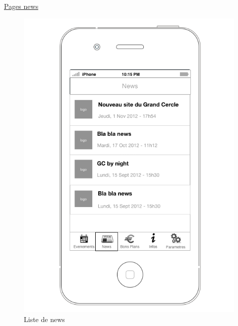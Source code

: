 \documentclass[a4paper, 11px]{article}
\begin{document}
\underline{Pages news}
\begin{figure}[h!]
	\begin{minipage}[c]{.50\linewidth}
		\begin{center}
			\includegraphics[scale=0.3]{../../Sketch/iOS/news_liste.png}
		\end{center}
	\caption{Liste de news}


\end{minipage}
\end{figure}
\end{document}
